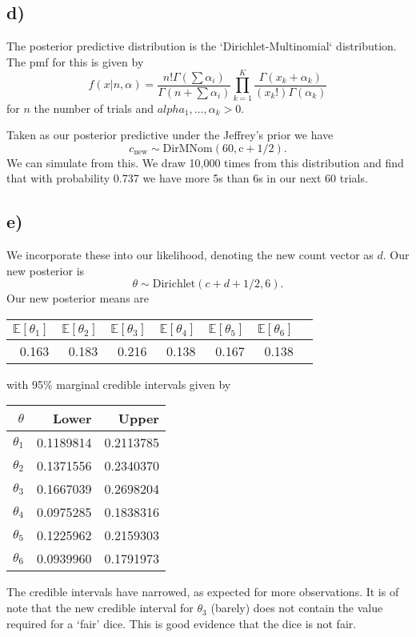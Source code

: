 \documentclass[12pt]{extarticle}
\newcommand{\E}{\mathbb{E}}
\begin{document}
\subsection*{d)}
The posterior predictive distribution is the `Dirichlet-Multinomial` distribution. The pmf for this is given by 
\[
f(x|n, \alpha) = \frac{n!\Gamma(\sum\alpha_i)}{\Gamma(n+\sum\alpha_i)}\prod_{k=1}^{K}\frac{\Gamma(x_k+\alpha_k)}{(x_k!)\Gamma(\alpha_k)}
\]
for $n$ the number of trials and $alpha_1, \dots, \alpha_k > 0.$ 

Taken as our posterior predictive under the Jeffrey's prior we have $$c_{\text{new}}\sim \mathrm{DirMNom(60, c + 1/2)}.$$
We can simulate from this. We draw 10,000 times from this distribution and find that with probability 0.737 we have more 5s than 6s in our next 60 trials.

\subsection*{e)}
We incorporate these into our likelihood, denoting the new count vector as $d$. Our new posterior is $$\theta \sim \mathrm{Dirichlet}(c+d+1/2, 6).$$ Our new posterior means are 
\begin{table}[H]
	\centering
	\begin{tabular}{rrrrrrr}
		\hline
		$\E\left[\theta_1\right]$ & $\E\left[\theta_2\right]$ & $\E\left[\theta_3\right]$ & $\E\left[\theta_4\right]$ & $\E\left[\theta_5\right]$ & $\E\left[\theta_6\right]$ \\ 
		\hline
		0.163 &0.183 &0.216 &0.138 &0.167 &0.138 \\ 
		\hline
	\end{tabular}
\end{table}
with 95\% marginal credible intervals given by 
\begin{table}[H]
	\centering
	\begin{tabular}{r|rr}
		\hline
		$\theta$ & Lower & Upper\\
		\hline
		$\theta_1$ &0.1189814 &0.2113785\\
		$\theta_2$ &0.1371556 &0.2340370\\
		$\theta_3$ &0.1667039 &0.2698204\\
		$\theta_4$ &0.0975285 &0.1838316\\
		$\theta_5$ &0.1225962 &0.2159303\\
		$\theta_6$ &0.0939960 &0.1791973\\
	\end{tabular}
\end{table}
The credible intervals have narrowed, as expected for more observations. It is of note that the new credible interval for $\theta_3$ (barely) does not contain the value required for a `fair' dice. This is good evidence that the dice is not fair. 
\end{document}
